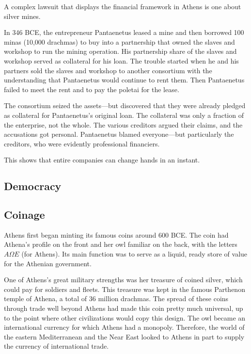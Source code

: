 \documentclass{article}
\begin{document}
    \begin{example}
      \label{ex:court-on-mining-leases}
      A complex lawsuit that displays the financial framework in Athens is one about silver mines. 

      In 346 BCE, the entrepreneur Pantaenetus leased a mine and then borrowed 100 minas (10,000 drachmas) to buy into a partnership that owned the slaves and workshop to run the mining operation. His partnership share of the slaves and workshop served as collateral for his loan. The trouble started when he and his partners sold the slaves and workshop to another consortium with the understanding that Pantaenetus would continue to rent them. Then Pantaenetus failed to meet the rent and to pay the poletai for the lease.

      The consortium seized the assets—but discovered that they were already pledged as collateral for Pantaenetus’s original loan. The collateral was only a fraction of the enterprise, not the whole. The various creditors argued their claims, and the accusations got personal. Pantaenetus blamed everyone—but particularly the creditors, who were evidently professional financiers. 

      This shows that entire companies can change hands in an instant.
    \end{example}

  \subsection{Democracy}

  \subsection{Coinage}

    \begin{finance}
      Athens first began minting its famous coins around 600 BCE. The coin had Athena's profile on the front and her owl familiar on the back, with the letters $A\Omega E$ (for Athens). Its main function was to serve as a liquid, ready store of value for the Athenian government. 
    \end{finance}

    One of Athens's great military strengths was her treasure of coined silver, which could pay for soldiers and fleets. This treasure was kept in the famous Parthenon temple of Athena, a total of 36 million drachmas. The spread of these coins through trade well beyond Athens had made this coin pretty much universal, up to the point where other civilizations would copy this design. The owl became an international currency for which Athens had a monopoly. Therefore, the world of the eastern Mediterranean and the Near East looked to Athens in part to supply the currency of international trade.
\end{document}
